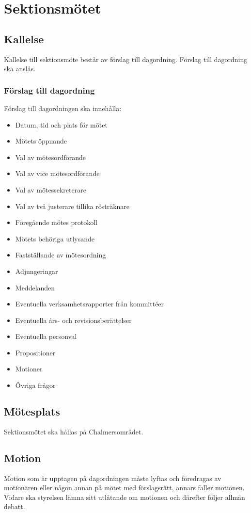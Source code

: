 \section{Sektionsmötet}

\subsection{Kallelse} 
Kallelse till sektionsmöte består av förslag till dagordning. Förslag till
dagordning ska anslås.

\subsubsection{Förslag till dagordning}
Förslag till dagordningen ska innehålla:
\begin{itemize}  
  \item Datum, tid och plats för mötet 
  \item Mötets öppnande 
  \item Val av mötesordförande
  \item Val av vice mötesordförande
  \item Val av mötessekreterare 
  \item Val av två justerare tillika rösträknare 
  \item Föregående mötes protokoll
  \item Mötets behöriga utlysande 
  \item Fastställande av mötesordning 
  \item Adjungeringar 
  \item Meddelanden 
  \item Eventuella verksamhetsrapporter från kommittéer 
  \item Eventuella års- och revisionsberättelser 
  \item Eventuella personval 
  \item Propositioner 
  \item Motioner 
  \item Övriga frågor 
\end{itemize}
\subsection{Mötesplats} 
Sektionsmötet ska hållas på Chalmersområdet.
\subsection{Motion}
Motion som är upptagen på dagordningen måste lyftas och föredragas av motionären eller någon annan på mötet med förslagsrätt, annars faller motionen.
Vidare ska styrelsen lämna sitt utlåtande om motionen och därefter följer allmän debatt.
